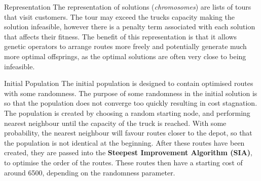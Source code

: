 \documentclass[ %
                    author={Callum Mann},
                     title={Genetic algorithm for the CVRP},
                  subtitle={Capacitated Vehicle Routing Problem},
                      type={Heuristic},
                      year={2016}]{poster}
\begin{document}

\begin{frame}{}


\begin{columns}[t]
  \begin{column}{0.422\linewidth}
    \begin{block}{\Large Representation}
      The representation of solutions (\textit{chromosomes}) are lists of tours that visit
      customers. The tour may exceed the trucks capacity making the solution infeasible,
      however there is a penalty term associated with each solution that affects their fitness.
      The benefit of this representation is that it allows genetic operators to arrange
      routes more freely and potentially generate much more optimal offsprings, as
      the optimal solutions are often very close to being infeasible.


    \end{block}
    \vspace{1cm}

    \begin{block}{\Large Initial Population}
      The initial population is designed to contain optimised routes with some randomness.
      The purpose of some randomness in the initial solution is so that the population does not
      converge too quickly resulting in cost stagnation. \vspace{1cm} \\
      The population is created by choosing a random starting node, and performing nearest neighbour
      until the capacity of the truck is reached. With some probability, the nearest neighbour will favour
      routes closer to the depot, so that the population is not identical at the beginning. After these routes have been
      created, they are passed into the \textbf{Steepest Improvement Algorithm (SIA)}, to optimise the order of the routes.
      These routes then have a starting cost of around 6500, depending on the randomness parameter.
    \end{block}
    \vspace{1cm}


\end{column}
\end{columns}
\end{frame}
\end{document}
